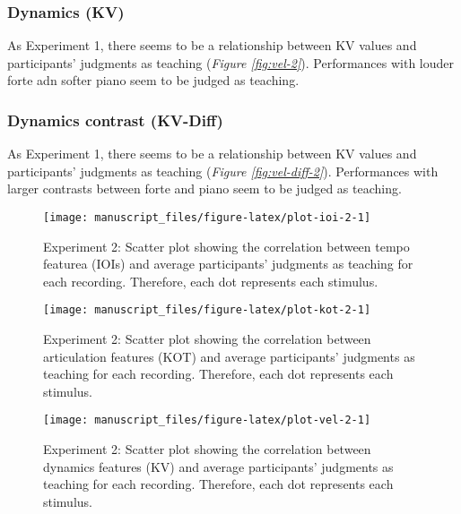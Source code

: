 \documentclass[
  man,floatsintext]{apa6}
\begin{document}
\hypertarget{dynamics-kv-1}{%
\subsubsection{Dynamics (KV)}\label{dynamics-kv-1}}

As Experiment 1, there seems to be a relationship between KV values and participants' judgments as teaching (\emph{Figure \ref{fig:vel-2}}). Performances with louder forte adn softer piano seem to be judged as teaching.

\hypertarget{dynamics-contrast-kv-diff-1}{%
\subsubsection{Dynamics contrast (KV-Diff)}\label{dynamics-contrast-kv-diff-1}}

As Experiment 1, there seems to be a relationship between KV values and participants' judgments as teaching (\emph{Figure \ref{fig:vel-diff-2}}). Performances with larger contrasts between forte and piano seem to be judged as teaching.

\begin{figure}

{\centering \texttt{[image: manuscript\_files/figure-latex/plot-ioi-2-1]} 

}

\caption{\label{fig:ioi-2}Experiment 2: Scatter plot showing the correlation between tempo featurea (IOIs) and average participants' judgments as teaching for each recording. Therefore, each dot represents each stimulus.}\label{fig:plot-ioi-2}
\end{figure}

\begin{figure}

{\centering \texttt{[image: manuscript\_files/figure-latex/plot-kot-2-1]} 

}

\caption{\label{fig:kot-2}Experiment 2: Scatter plot showing the correlation between articulation features (KOT) and average participants' judgments as teaching for each recording. Therefore, each dot represents each stimulus.}\label{fig:plot-kot-2}
\end{figure}

\begin{figure}

{\centering \texttt{[image: manuscript\_files/figure-latex/plot-vel-2-1]} 

}

\caption{\label{fig:vel-2}Experiment 2: Scatter plot showing the correlation between dynamics features (KV) and average participants' judgments as teaching for each recording. Therefore, each dot represents each stimulus.}\label{fig:plot-vel-2}
\end{figure}
\end{document}
